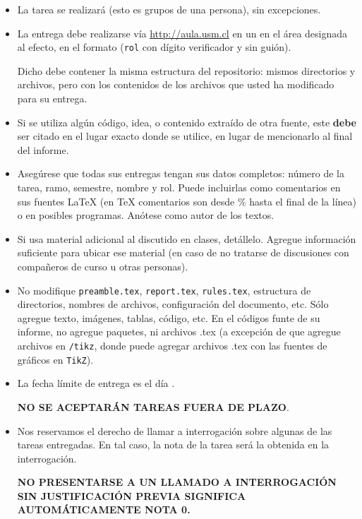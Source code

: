 
  \begin{itemize}
  \item
    La tarea se realizará 
    (esto es grupos de una persona),
    sin excepciones.
  \item
    La entrega debe realizarse vía \url{http://aula.usm.cl}
    en un  en el área designada al efecto,
    en el formato 
    (\texttt{rol} con dígito verificador y sin guión).

    Dicho  debe contener la misma estructura del repositorio: mismos directorios y archivos, pero con los contenidos de los archivos que usted ha modificado para su entrega.

  \item Si se utiliza algún código, idea, o contenido extraído de otra fuente, este \textbf{debe} ser citado en el lugar exacto donde se utilice, en lugar de mencionarlo al final del informe. 
  \item
    Asegúrese que todas sus entregas tengan sus datos completos:
    número de la tarea, ramo, semestre, nombre y rol.
    Puede incluirlas como comentarios en sus fuentes \LaTeX{}
    (en \TeX{} comentarios son desde \% hasta el final de la línea)
    o en posibles programas.
    Anótese como autor de los textos.
 
  \item
    Si usa material adicional al discutido en clases,
    detállelo.
    Agregue información suficiente para ubicar ese material
    (en caso de no tratarse de discusiones con compañeros de curso
     u otras personas).
    \item No modifique \texttt{preamble.tex}, \texttt{report.tex}, \texttt{rules.tex}, estructura de directorios, nombres de archivos, configuración del documento, etc. Sólo agregue texto, imágenes, tablas, código, etc. En el códigos funte de su informe, no agregue paquetes, ni archivos .tex (a excepción de que agregue archivos en \texttt{/tikz}, donde puede agregar archivos .tex con las fuentes de gráficos en \texttt{TikZ}).

  \item

    La fecha límite de entrega es el día \tcm{\deadline}.

    \begin{center}
        \Large{
          \textbf{NO SE ACEPTARÁN TAREAS FUERA DE PLAZO}.
        }
        \normalsize
    \end{center}
     
    
  \item
    Nos reservamos el derecho de llamar a interrogación
    sobre algunas de las tareas entregadas.
    En tal caso,
    la nota de la tarea será la obtenida en la interrogación.
    \begin{center}
      \Large{
        \textbf{NO PRESENTARSE A UN LLAMADO A INTERROGACIÓN SIN JUSTIFICACIÓN PREVIA SIGNIFICA AUTOMÁTICAMENTE NOTA 0.}
      }
    \end{center}
    
  \end{itemize}
